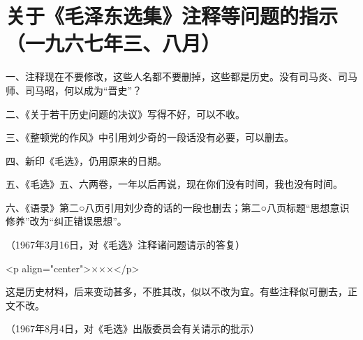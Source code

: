 \section[关于《毛泽东选集》注释等问题的指示（一九六七年三、八月）]{关于《毛泽东选集》注释等问题的指示（一九六七年三、八月）}


一、注释现在不要修改，这些人名都不要删掉，这些都是历史。没有司马炎、司马师、司马昭，何以成为“晋史”？

二、《关于若干历史问题的决议》写得不好，可以不收。

三、《整顿党的作风》中引用刘少奇的一段话没有必要，可以删去。

四、新印《毛选》，仍用原来的日期。

五、《毛选》五、六两卷，一年以后再说，现在你们没有时间，我也没有时间。

六、《语录》第二○八页引用刘少奇的话的一段也删去；第二○八页标题“思想意识修养”改为“纠正错误思想”。

{\raggedleft （1967年3月16日，对《毛选》注释诸问题请示的答复）\par}

<p align="center">×××</p>

这是历史材料，后来变动甚多，不胜其改，似以不改为宜。有些注释似可删去，正文不改。

{\raggedleft （1967年8月4日，对《毛选》出版委员会有关请示的批示）\par}


